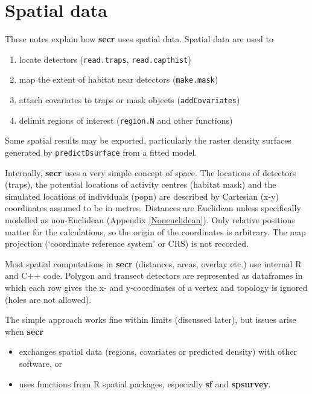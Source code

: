 \documentclass[
]{book}
\providecommand{\tightlist}{%
  \setlength{\itemsep}{0pt}\setlength{\parskip}{0pt}}
\begin{document}
\appendix {}


\chapter{Spatial data}\label{Spatialdata}

These notes explain how \textbf{secr} uses spatial data. Spatial data are used to

\begin{enumerate}
\def\labelenumi{\arabic{enumi}.}
\tightlist
\item
  locate detectors (\texttt{read.traps}, \texttt{read.capthist})
\item
  map the extent of habitat near detectors (\texttt{make.mask})
\item
  attach covariates to traps or mask objects (\texttt{addCovariates})
\item
  delimit regions of interest (\texttt{region.N} and other functions)
\end{enumerate}

Some spatial results may be exported, particularly the raster density surfaces
generated by \texttt{predictDsurface} from a fitted model.

Internally, \textbf{secr} uses a very simple concept of space. The locations of detectors (traps), the potential locations of activity centres (habitat mask) and the simulated locations of individuals (popn) are described by Cartesian (x-y) coordinates assumed to be in metres. Distances are Euclidean unless specifically modelled as non-Euclidean (Appendix \ref{Noneuclidean}). Only relative positions matter for the calculations, so the origin of the coordinates is arbitrary. The map projection (`coordinate reference system' or CRS) is not recorded.

Most spatial computations in \textbf{secr} (distances, areas, overlay etc.) use internal R and C++ code. Polygon and transect detectors are represented as dataframes in which each row gives the x- and y-coordinates of a vertex and topology is ignored (holes are not allowed).

The simple approach works fine within limits (discussed later), but issues arise when \textbf{secr}

\begin{itemize}
\tightlist
\item
  exchanges spatial data (regions, covariates or predicted density) with other software, or
\item
  uses functions from R spatial packages, especially \textbf{sf} and \textbf{spsurvey}.
\end{itemize}
\end{document}
